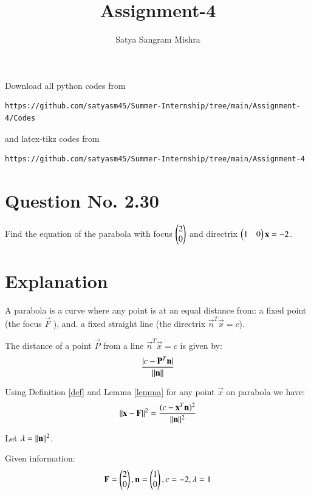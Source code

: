 \documentclass[journal,12pt,twocolumn]{IEEEtran}
\begin{document}
     \def\centbox#1{\makebox[0in]{#1}}
     \def\topbox#1{\raisebox{-\baselineskip}[0in][0in]{#1}}
     \def\midbox#1{\raisebox{-0.5\baselineskip}[0in][0in]{#1}}
\vspace{3cm}
\title{Assignment-4}
\author{Satya Sangram Mishra}
\maketitle
\newpage
\bigskip
\renewcommand{\thefigure}{\theenumi}
\renewcommand{\thetable}{\theenumi}
Download all python codes from 
\begin{lstlisting}
https://github.com/satyasm45/Summer-Internship/tree/main/Assignment-4/Codes
\end{lstlisting}
%
and latex-tikz codes from 
%
\begin{lstlisting}
https://github.com/satyasm45/Summer-Internship/tree/main/Assignment-4
\end{lstlisting}
%
\section{Question No. 2.30}
Find the equation of the parabola with focus $\begin{pmatrix}2\\0\end{pmatrix}$ and directrix $\begin{pmatrix}1&0\end{pmatrix}\mathbf{x}=-2$.
%
\section{Explanation}
\begin{definition}
\label{def}
A parabola is a curve where any point is at an equal distance from: a fixed point (the focus $\vec{F}$ ), and. a fixed straight line (the directrix $\vec{n}^T\vec{x}=c$).
\end{definition}
\begin{lemma}
\label{lemma}
The distance of a point $\vec{P}$ from a line $\vec{n}^T\vec{x}=c$ is given by:
\begin{align}
\frac{\vert c-\mathbf{P}^T\mathbf{n}\vert}{\Vert\mathbf{n}\rVert}   
\end{align}
\end{lemma}

Using Definition \ref{def} and Lemma \ref{lemma} for any point $\vec{x}$ on parabola we have:
\begin{align}
\Vert\mathbf{x}-\mathbf{F}\rVert^2=\frac{({c-\mathbf{x}^T\mathbf{n}})^2}{\Vert\mathbf{n}\rVert^2}\label{eq:1} 
\end{align}


Let $\lambda=\Vert\mathbf{n}\rVert^2$.

Given information:
\begin{align}
\mathbf{F}=\begin{pmatrix}2\\0\end{pmatrix},
\mathbf{n}=\begin{pmatrix}1\\0\end{pmatrix},
c=-2\label{eq:2},
\lambda=1
\end{align}
\end{document}
